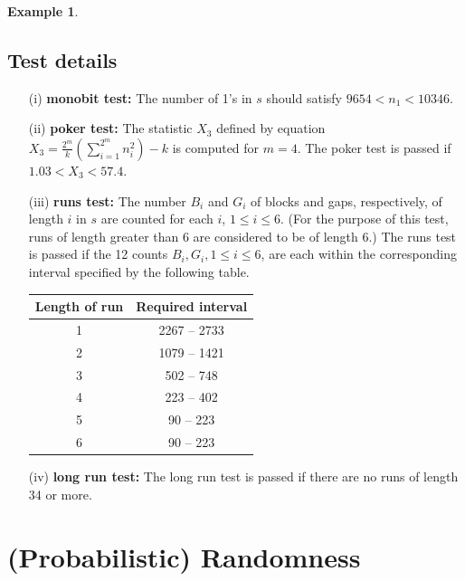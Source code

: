 \documentclass[12pt,openany]{book}
\theoremstyle{definition}
\newtheorem{example}{Example}[chapter]
\newcommand{\of}[1]{\left(#1\right)}
\begin{document}
\begin{example}
	\subsection*{Test details}
	\begin{enumerate}
		\item[(i)] \textbf{monobit test:} The number of 1's in \( s \) should satisfy \( 9654 < n_1 < 10346 \).
		\item[(ii)] \textbf{poker test:} The statistic \( X_3 \) defined by equation \( X_3=\frac{2^m}{k}\of{\sum_{i=1}^{2^m}n_i^2}-k \) is computed for \( m = 4 \). The poker test is passed if \( 1.03 < X_3 < 57.4 \).
		\item[(iii)] \textbf{runs test:} The number \( B_i \) and \( G_i \) of blocks and gaps, respectively, of length \( i \) in \( s \) are counted for each \( i \), \( 1 \leq i \leq 6 \). (For the purpose of this test, runs of length greater than 6 are considered to be of length 6.) The runs test is passed if the 12 counts \( B_i, G_i, 1 \leq i \leq 6 \), are each within the corresponding interval specified by the following table.
		\begin{table}[h!]\centering
			\begin{tabular}{c|c}
				\toprule
				Length of run & Required interval \\
				\hline\hline
				1 & 2267 -- 2733\\
				2 & 1079 -- 1421\\
				3 & 502 -- 748\\
				4 & 223 -- 402\\
				5 & 90 -- 223\\
				6 & 90 -- 223\\
				\bottomrule
			\end{tabular}
		\end{table}
		\item[(iv)] \textbf{long run test:} The long run test is passed if there are no runs of length 34 or more.
	\end{enumerate}
	
\end{example}

\section{(Probabilistic) Randomness}
\end{document}
